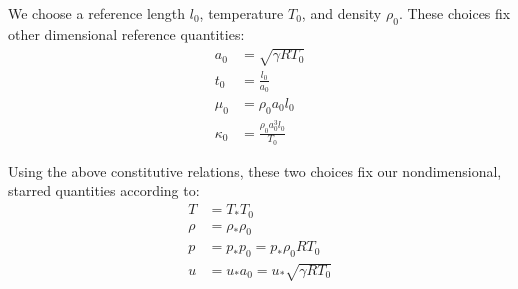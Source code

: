 \documentclass[letterpaper,11pt,nointlimits]{amsart}
\begin{document}
We choose a reference length $l_{0}$, temperature $T_{0}$,
and density $\rho_{0}$.  These choices fix other dimensional
reference quantities:
\begin{align*}
  a_{0} &= \sqrt{\gamma{}RT_{0}}
  \\
  t_{0} &= \frac{l_{0}}{a_{0}}
  \\
  \mu_{0} &= \rho_{0} a_{0} l_{0}
  \\
  \kappa_{0} &= \frac{\rho_{0} a_{0}^{3} l_{0}}{T_{0}}
\end{align*}

Using the above constitutive relations, these two choices fix our
nondimensional, starred quantities according to:
\begin{align}
  T &= T_{*} T_{0}
  \\
  \rho &= \rho_{*} \rho_{0}
  \\
  p &= p_{*} p_{0} = p_{*} \rho_{0} R T_{0}
  \\
  u &= u_{*} a_{0} = u_{*} \sqrt{\gamma{}RT_{0}}
  \label{eq:refquantities}
\end{align}
\end{document}
